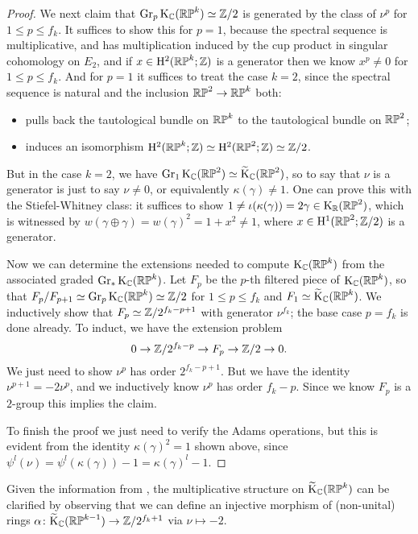 \begin{proof}
  We next claim that $\operatorname{Gr}_p\mathrm{K}_{\mathbb{C}}(\mathbb{RP}^k) \simeq \mathbb{Z}/2$ is generated by
  the class of $\nu^p$ for $1 \le p \le f_k$. It suffices to show this
  for $p=1$, because the spectral sequence is multiplicative, and has
  multiplication induced by the cup product in singular cohomology on
  $E_2$, and if $x \in \mathrm{H}^2(\mathbb{RP}^k;\mathbb{Z})$ is a generator then we know
  $x^p \ne 0$ for $1 \le p \le f_k$. And for $p=1$ it suffices to
  treat the case $k=2$, since the spectral sequence is natural and the
  inclusion $\mathbb{RP}^2 \to \mathbb{RP}^k$ both:
  \begin{itemize}
  \item pulls back the tautological bundle on $\mathbb{RP}^k$ to the
    tautological bundle on $\mathbb{RP}^2$;
  \item induces an isomorphism $\mathrm{H}^2(\mathbb{RP}^k;\mathbb{Z}) \simeq \mathrm{H}^2(\mathbb{RP}^2;\mathbb{Z})
    \simeq \mathbb{Z}/2$.
  \end{itemize}
  But in the case $k=2$, we have $ \operatorname{Gr}_1\mathrm{K}_{\mathbb{C}}(\mathbb{RP}^2) \simeq
  \widetilde{\mathrm{K}}_{\mathbb{C}}(\mathbb{RP}^2)$, so to say that $\nu$ is a generator is just to say
  $\nu \ne 0$, or equivalently $\kappa(\gamma) \ne 1$. One can prove
  this with the Stiefel-Whitney class: it suffices to show $1 \ne
  \iota(\kappa(\gamma)) = 2\gamma \in \mathrm{K}_{\mathbb{R}}(\mathbb{RP}^2)$, which is
  witnessed by $w(\gamma\oplus\gamma) = w(\gamma)^2 = 1+x^2 \ne 1$,
  where $x \in \mathrm{H}^1(\mathbb{RP}^2;\mathbb{Z}/2)$ is a generator.

  Now we can determine the extensions needed to compute $\mathrm{K}_{\mathbb{C}}(\mathbb{RP}^k)$
  from the associated graded $\operatorname{Gr}_*\mathrm{K}_{\mathbb{C}}(\mathbb{RP}^k)$. Let $F_p$ be the
  $p$-th filtered piece of $\mathrm{K}_{\mathbb{C}}(\mathbb{RP}^k)$, so that $F_p/F_{p+1} \simeq
  \operatorname{Gr}_p\mathrm{K}_{\mathbb{C}}(\mathbb{RP}^k) \simeq \mathbb{Z}/2$ for $1 \le p \le f_k$ and $F_1 \simeq
  \widetilde{\mathrm{K}}_{\mathbb{C}}(\mathbb{RP}^k)$. We inductively show that $F_p \simeq
  \mathbb{Z}/2^{f_k-p+1}$ with generator $\nu^{f_k}$; the base case $p=f_k$ is
  done already. To induct, we have the extension problem
  \[
  0 \to \mathbb{Z}/2^{f_k-p} \to F_p \to \mathbb{Z}/2 \to 0.
  \]
  We just need to show $\nu^p$ has order $2^{f_k-p+1}$. But we have the
  identity $\nu^{p+1} = -2\nu^p$, and we inductively know $\nu^p$ has
  order $f_k-p$. Since we know $F_p$ is a $2$-group this implies the
  claim.

  To finish the proof we just need to verify the Adams operations, but
  this is evident from the identity $\kappa(\gamma)^2 = 1$ shown
  above, since $\psi^l(\nu) = \psi^l(\kappa(\gamma)) - 1 =
  \kappa(\gamma)^l - 1$.
\end{proof}

\begin{remark}
  \label{RP-ringhom}
  Given the information from , the multiplicative
  structure on $\widetilde{\mathrm{K}}_{\mathbb{C}}(\mathbb{RP}^k)$ can be clarified by observing that we
  can define an injective morphism of (non-unital) rings $\alpha \colon
  \widetilde{\mathrm{K}}_{\mathbb{C}}(\mathbb{RP}^{k-1}) \to \mathbb{Z}/2^{f_k+1}$ via $\nu \mapsto -2$.
\end{remark}

